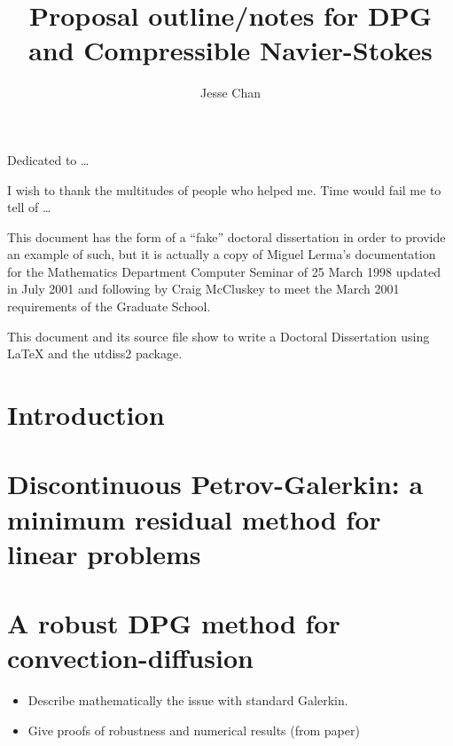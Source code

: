 \documentclass{report}
\date{}
\author{Jesse Chan}
\title{Proposal outline/notes for DPG and Compressible Navier-Stokes}
\begin{document}
\copyrightpage          %
\commcertpage           %
\titlepage

\begin{dedication}
%
Dedicated to \ldots
\end{dedication}


\begin{acknowledgments}		%
%
I wish to thank the multitudes of people who helped me. Time would
fail me to tell of \ldots
\end{acknowledgments}

\utabstract
{}%
\indent
This document has the form of a ``fake'' doctoral dissertation
in order to provide an example of such, but it is actually a
copy of Miguel Lerma's documentation for the Mathematics
Department Computer Seminar of 25 March 1998 updated in July 2001
and following by Craig McCluskey to meet the March 2001
requirements of the Graduate School.

This document and its source file show to write a Doctoral Dissertation using 
\LaTeX{} and the utdiss2 package. 

\tableofcontents   %



\chapter{Introduction}



\chapter{Discontinuous Petrov-Galerkin: a minimum residual method for linear problems}




\chapter{A robust DPG method for convection-diffusion}

\begin{itemize}
\item Describe mathematically the issue with standard Galerkin.
\item Give proofs of robustness and numerical results (from paper)\cite{ChanHeuerBui-ThanhDemkowicz12}
\end{itemize}
\end{document}
